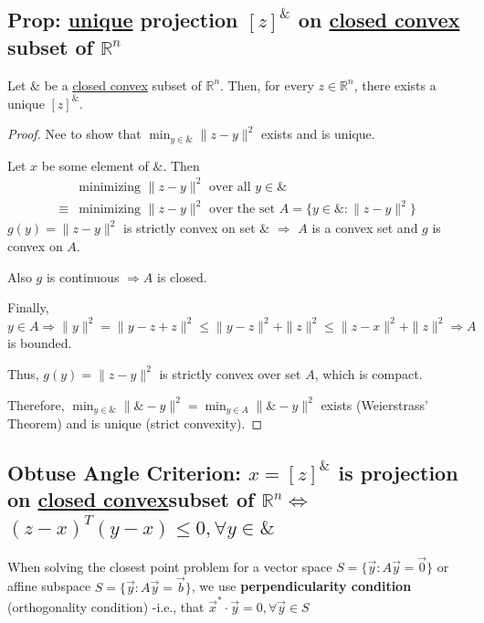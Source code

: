 \documentclass[11pt]{elegantbook}
\begin{document}
\subsection{Prop: \underline{unique} projection $[z]^\&$ on \underline{closed convex} subset of $\mathbb{R}^n$}
\begin{proposition}
    Let $\&$ be a \underline{closed convex} subset of $\mathbb{R}^n$. Then, for every $z\in \mathbb{R}^n$, there exists a unique $[z]^\&$.
\end{proposition}
\begin{proof}
Nee to show that $\min_{y\in \&}\|z-y\|^2$ exists and is unique.

Let $x$ be some element of $\&$. Then
\begin{equation}
    \begin{aligned}
        &\text{minimizing $\|z-y\|^2$ over all $y\in\&$}\\
        \equiv&\text{minimizing $\|z-y\|^2$ over the set $A=\{y\in\&:\|z-y\|^2\}$}
    \end{aligned}
    \nonumber
\end{equation}
$g(y)=\|z-y\|^2$ is strictly convex on set $\&$ $\Rightarrow$ $A$ is a convex set and $g$ is convex on $A$.

Also $g$ is continuous $\Rightarrow	A$ is closed.

Finally, $y\in A \Rightarrow \|y\|^2=\|y-z+z\|^2\leq \|y-z\|^2+\|z\|^2\leq \|z-x\|^2+\|z\|^2 \Rightarrow A$ is bounded.

Thus, $g(y)=\|z-y\|^2$ is strictly convex over set $A$, which is compact.

Therefore, $\min_{y\in\&}\|\&-y\|^2=\min_{y\in A}\|\&-y\|^2$ exists (Weierstrass’ Theorem) and is unique (strict convexity).
\end{proof}

\subsection{Obtuse Angle Criterion: $x=[z]^\&$ is projection on \underline{closed convex}subset of $\mathbb{R}^n$$\Leftrightarrow$ $(z-x)^T(y-x)\leq 0, \forall y\in\&$}

When solving the closest point problem for a vector space $S=\{\vec{y}:A \vec{y}=\vec{0}\}$ or affine subspace $S=\{\vec{y}:A \vec{y}=\vec{b}\}$, we use \textbf{perpendicularity condition} (orthogonality condition) -i.e., that $\vec{x}^*\cdot \vec{y}=0,\forall \vec{y}\in S$
\end{document}
